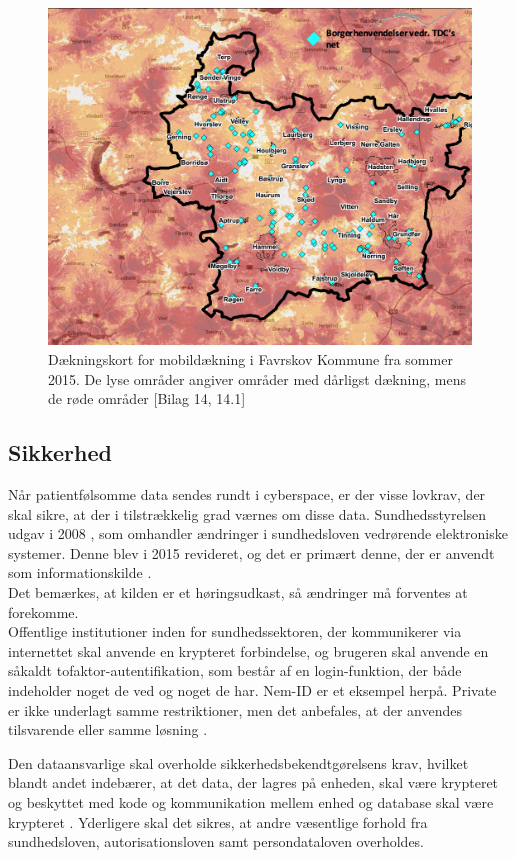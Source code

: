 \begin{figure}[H]
\centering
\includegraphics[width=1\textwidth]{Figurer/Snip20160526_3}
\caption{\label{fig:dkort}Dækningskort for mobildækning i Favrskov Kommune fra sommer 2015. De lyse områder angiver områder med dårligst dækning, mens de røde områder  [Bilag 14, 14.1]}
\end{figure}

\subsection{Sikkerhed}
Når patientfølsomme data sendes rundt i cyberspace, er der visse lovkrav, der skal sikre, at der i tilstrækkelig grad værnes om disse data.
Sundhedsstyrelsen udgav i 2008 , som omhandler ændringer i sundhedsloven vedrørende elektroniske systemer. Denne blev i 2015 revideret, og det er primært denne, der er anvendt som informationskilde \cite{vogi}.\\
Det bemærkes, at kilden er et høringsudkast, så ændringer må forventes at forekomme.\\
Offentlige institutioner inden for sundhedssektoren, der kommunikerer via internettet skal anvende en krypteret forbindelse, og brugeren skal anvende en såkaldt tofaktor-autentifikation, som består af en login-funktion, der både indeholder noget de ved og noget de har. Nem-ID er et eksempel herpå. Private er ikke underlagt samme restriktioner, men det anbefales, at der anvendes tilsvarende eller samme løsning \cite{vogi}.

Den dataansvarlige skal overholde sikkerhedsbekendtgørelsens krav, hvilket blandt andet indebærer, at det data, der lagres på enheden, skal være krypteret og beskyttet med kode og kommunikation mellem enhed og database skal være krypteret \cite{shbekendt}. Yderligere skal det sikres, at andre væsentlige forhold fra sundhedsloven, autorisationsloven samt persondataloven overholdes. 

